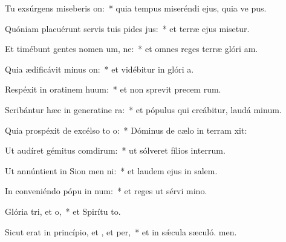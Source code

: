 \item Tu exsúrgens miseberis on:~* quia tempus miseréndi ejus, quia ve pus.
\item Quóniam placuérunt servis tuis pides jus:~* et terræ ejus misetur.
\item Et timébunt gentes nomen um, ne:~* et omnes reges terræ glóri am.
\item Quia ædificávit minus on:~* et vidébitur in glóri a.
\item Respéxit in oratinem huum:~* et non sprevit precem rum.
\item Scribántur hæc in generatine ra:~* et pópulus qui creábitur, laudá minum.
\item Quia prospéxit de excélso to o:~* Dóminus de cælo in terram xit:
\item Ut audíret gémitus comdirum:~* ut sólveret fílios interrum.
\item Ut annúntient in Sion men ni:~* et laudem ejus in salem.
\item In conveniéndo pópu in num:~* et reges ut sérvi mino.
\item Glória tri, et o,~* et Spirítu to.
\item Sicut erat in princípio, et , et per,~* et in sǽcula sæculó. men.
